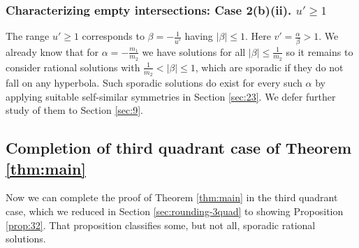 \documentclass[12pt,letterpaper, reqno]{amsart}
\theoremstyle{definition}
\theoremstyle{remark}
\newcommand{\uu}{{u'}}
\newcommand{\vv}{{v'}}
\begin{document}
\subsubsection{Characterizing empty intersections: Case 2(b)(ii). $ {\uu} \ge 1$}\label{sec:553}

The range $\uu \ge 1$ corresponds to $\beta = - \frac{1}{\uu}$ having $|\beta|\le 1$.
Here $\vv = \frac{\alpha}{\beta} >1.$ We already know that for $\alpha= -\frac{m_1}{m_2}$
we have solutions for all $|\beta| \le \frac{1}{m_2}$ so it remains to consider rational solutions with
$\frac{1}{m_2} < |\beta| \le 1$, which are sporadic if they do not fall on any hyperbola. 
Such sporadic solutions do exist for every such $\alpha$ by applying 
suitable  self-similar symmetries in Section \ref{sec:23}. 
We defer further study of them to Section \ref{sec:9}.

%
%
\subsection{Completion of third quadrant case of Theorem \ref{thm:main} }\label{sec:84}


Now we can complete the proof of Theorem \ref{thm:main} in the third quadrant case,
which we reduced in Section \ref{sec:rounding-3quad} to showing Proposition \ref{prop:32}.
That proposition classifies some, but not all, sporadic rational solutions.
\end{document}
